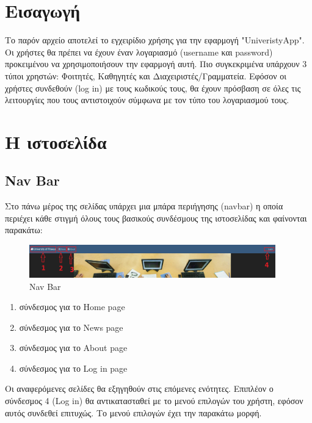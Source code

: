 \documentclass[12pt]{article}
\begin{document}
	\tableofcontents
	
	\newpage
	
	\section{Εισαγωγή}
	
	Το παρόν αρχείο αποτελεί το εγχειρίδιο χρήσης για την εφαρμογή "UniveristyApp". Οι χρήστες θα πρέπει να έχουν έναν λογαριασμό (username και password) προκειμένου να χρησιμοποιήσουν την εφαρμογή αυτή. Πιο συγκεκριμένα υπάρχουν 3 τύποι χρηστών: Φοιτητές, Καθηγητές και Διαχειριστές/Γραμματεία. Εφόσον οι χρήστες συνδεθούν (log in) με τους κωδικούς τους, θα έχουν πρόσβαση σε όλες τις λειτουργίες που τους αντιστοιχούν σύμφωνα με τον τύπο του λογαριασμού τους.
	
	\section{Η ιστοσελίδα}
	
	\subsection{Nav Bar}
	
	Στο πάνω μέρος της σελίδας υπάρχει μια μπάρα περιήγησης (navbar) η οποία περιέχει κάθε στιγμή όλους τους βασικούς συνδέσμους της ιστοσελίδας και φαίνονται παρακάτω:
	
	\begin{figure}[H]
		\centering
		\includegraphics[width=0.95\textwidth]{homes2.png}
		\caption{Nav Bar}
		\label{fig:bar}
	\end{figure}
	
	\begin{enumerate}
		\item σύνδεσμος για το Home page 
		\item σύνδεσμος για το News page
		\item σύνδεσμος για το About page
		\item σύνδεσμος για το Log in page
	\end{enumerate}
	
	Οι αναφερόμενες σελίδες θα εξηγηθούν στις επόμενες ενότητες. Επιπλέον ο σύνδεσμος 4 (Log in) θα αντικατασταθεί με το μενού επιλογών του χρήστη, εφόσον αυτός συνδεθεί επιτυχώς. Το μενού επιλογών έχει την παρακάτω μορφή.
	
\end{document}
